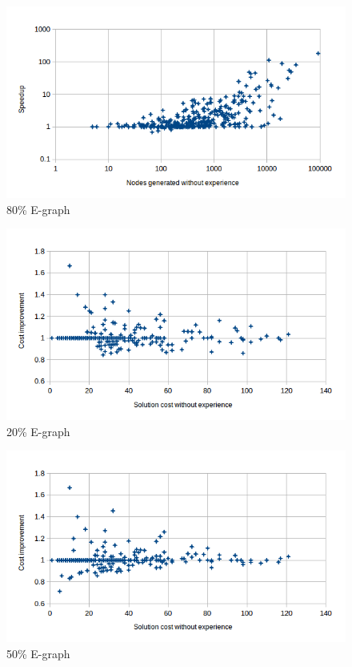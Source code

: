 \documentclass[letterpaper]{article}
\begin{document}
\begin{figure}
	\begin{center}
	\includegraphics[scale=0.5]{Speedup_80_0.png}
	\end{center}
	\caption{80\% E-graph}
	 \label{fig:s_80_0}
\end{figure}

\begin{figure}
	\begin{center}
	\includegraphics[scale=0.5]{Cost_20_0.png}
	\end{center}
	\caption{20\% E-graph}
	 \label{fig:c_20_0}
\end{figure}

\begin{figure}
	\begin{center}
	\includegraphics[scale=0.5]{Cost_50_0.png}
	\end{center}
	\caption{50\% E-graph}
	 \label{fig:c_50_0}
\end{figure}
\end{document}
